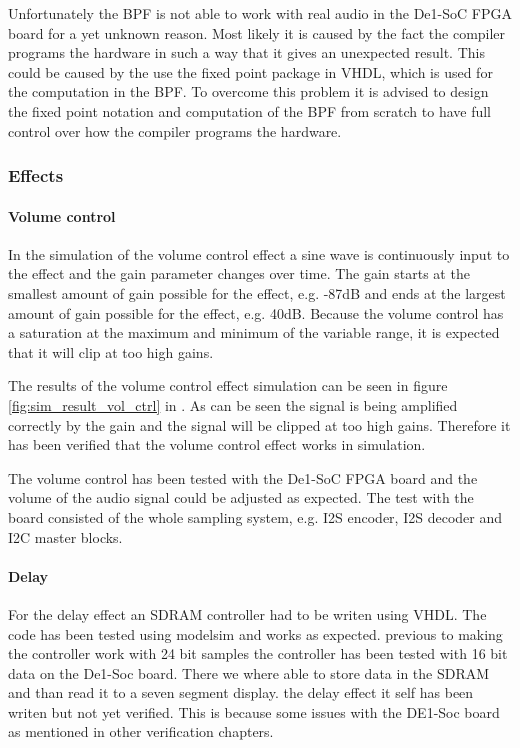 Unfortunately the BPF is not able to work with real audio in the De1-SoC FPGA board for a yet unknown reason. Most likely it is caused by the fact the compiler programs the hardware in such a way that it gives an unexpected result. This could be caused by the use the fixed point package in VHDL, which is used for the computation in the BPF. To overcome this problem it is advised to design the fixed point notation and computation of the BPF from scratch to have full control over how the compiler programs the hardware. 

\subsubsection{Effects}
\paragraph{Volume control}
In the simulation of the volume control effect a sine wave is continuously input to the effect and the gain parameter changes over time. The gain starts at the smallest amount of gain possible for the effect, e.g. -87dB and ends at the largest amount of gain possible for the effect, e.g. 40dB. Because the volume control has a saturation at the maximum and minimum of the variable range, it is expected that it will clip at too high gains. 

The results of the volume control effect simulation can be seen in figure \ref{fig:sim_result_vol_ctrl} in . As can be seen the signal is being amplified correctly by the gain and the signal will be clipped at too high gains. Therefore it has been verified that the volume control effect works in simulation.

The volume control has been tested with the De1-SoC FPGA board and the volume of the audio signal could be adjusted as expected. The test with the board consisted of the whole sampling system, e.g. I2S encoder, I2S decoder and I2C master blocks. 

\paragraph{Delay}
For the delay effect an SDRAM controller had to be writen using VHDL. The code has been tested using modelsim and works as expected. previous to making the controller work with 24 bit samples the controller has been tested with 16 bit data on the De1-Soc board. There we where able to store data in the SDRAM and than read it to a seven segment display. the delay effect it self has been writen but not yet verified. This is because some issues with the DE1-Soc board as mentioned in other verification chapters.

